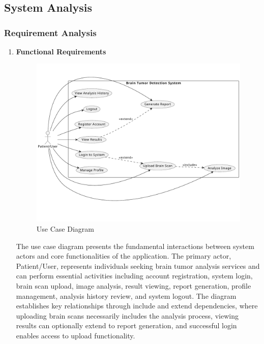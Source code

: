 \section*{\Large{}}
\label{3}

\subsection{System Analysis}

\subsubsection{Requirement Analysis}
\begin{enumerate}[label=\roman*.]
    \item \textbf{Functional Requirements}
          \begin{center}
              \begin{figure}[H]
                  \centering
                  \includegraphics[width=0.85\linewidth]{Images/usecase.pdf}
                  \caption{Use Case Diagram}
                  \label{fig:UseCaseDiagram}
              \end{figure}
          \end{center}
          The use case diagram presents the fundamental interactions between system actors and core functionalities of the application. The primary actor, Patient/User, represents individuals seeking brain tumor analysis services and can perform essential activities including account registration, system login, brain scan upload, image analysis, result viewing, report generation, profile management, analysis history review, and system logout. The diagram establishes key relationships through include and extend dependencies, where uploading brain scans necessarily includes the analysis process, viewing results can optionally extend to report generation, and successful login enables access to upload functionality.


\end{enumerate}
